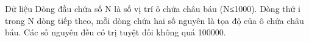 Dữ liệu  
Dòng đầu chứa số N là số vị trí ô chứa châu báu (N≤1000). Dòng thứ i trong N dòng tiếp theo, mỗi dòng chứa hai số nguyên là tọa độ của ô chứa châu báu. Các số nguyên đều có trị tuyệt đối không quá 100000.